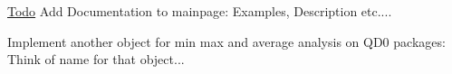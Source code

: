 \begin{Desc}
\item[\hyperlink{todo__todo000001}{Todo}]Add Documentation to mainpage: Examples, Description etc.... 

Implement another object for min max and average analysis on QD0 packages: Think of name for that object... \end{Desc}
